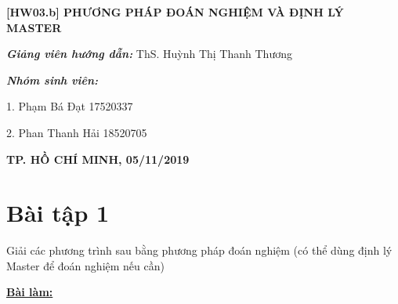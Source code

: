 \documentclass[12pt, a4paper, fleqn]{article}
\begin{document}
\begin{titlepage}
\begin{center}
			\vspace{2cm}
			
			\Large
			\textbf{[HW03.b] PHƯƠNG PHÁP ĐOÁN NGHIỆM VÀ ĐỊNH LÝ MASTER}
		
		\end{center}
			
			\vspace{3cm}
			\normalsize	
			
			\hspace{70pt} \textbf{\textit{Giảng viên hướng dẫn:}} ThS. Huỳnh Thị Thanh Thương\\
			
			\vspace*{1cm}
			
			\hspace{70pt} \textbf{\textit{Nhóm sinh viên:}}
			
			\vspace*{0.2cm}
			
			\hspace{70pt} 1. \hspace{10pt} Phạm Bá Đạt \hspace{60pt} 17520337
			
			\vspace*{0.2cm}
			\hspace{70pt} 2. \hspace{10pt} Phan Thanh Hải  \hspace{45pt} 18520705
			
			\vspace{4cm}
		
		\begin{center}
			\textbf{TP. HỒ CHÍ MINH, 05/11/2019}
		\end{center}
			
	\end{titlepage}

	\begin{center}
		\tableofcontents
	\end{center}
	\clearpage
	
	\setlength{\abovedisplayskip}{5pt}
	\setlength{\belowdisplayskip}{5pt}
	
	\section*{Bài tập 1}
		Giải các phương trình sau bằng phương pháp đoán nghiệm (có thể dùng định lý Master để đoán nghiệm nếu cần)
		
		\begin{center}
			\textbf{\underline{Bài làm:}}
		\end{center}
	
\end{document}

